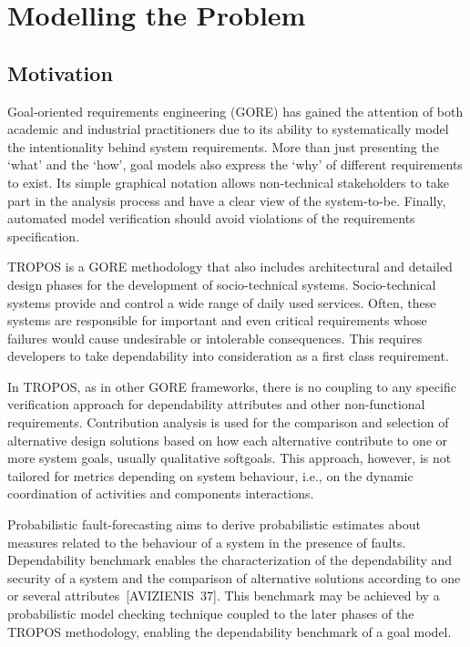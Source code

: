 \chapter{Modelling the Problem}\label{ch:motivation}

\section{Motivation}


Goal-oriented requirements engineering (GORE) has gained the attention of both academic and industrial practitioners due to its ability to systematically model the intentionality behind system requirements. More than just presenting the `what' and the `how', goal models also express the `why' of different requirements to exist. Its simple graphical notation allows non-technical stakeholders to take part in the analysis process and have a clear view of the system-to-be. Finally, automated model verification should avoid violations of the requirements specification.

TROPOS is a GORE methodology that also includes architectural and  detailed design phases for the development of socio-technical systems. Socio-technical systems provide and control a wide range of daily used services. Often, these systems are responsible for important and even critical requirements whose failures would cause undesirable or intolerable consequences. This requires developers to take dependability into consideration as a first class requirement.

In TROPOS, as in other GORE frameworks, there is no coupling to any specific verification approach for dependability attributes and other non-functional requirements. Contribution analysis is used for the comparison and selection of alternative design solutions based on how each alternative contribute to one or more system goals, usually qualitative softgoals. This approach, however, is not tailored for metrics depending on system behaviour, i.e., on the dynamic coordination of activities and components interactions. 

Probabilistic fault-forecasting aims to derive probabilistic estimates about measures related to the behaviour of a system in the presence of faults. Dependability benchmark enables the characterization of the dependability and security of a system and the comparison of alternative solutions according to one or several attributes~[AVIZIENIS~37]. This benchmark may be achieved by a probabilistic model checking technique coupled to the later phases of the TROPOS methodology, enabling the dependability benchmark of a goal model.

